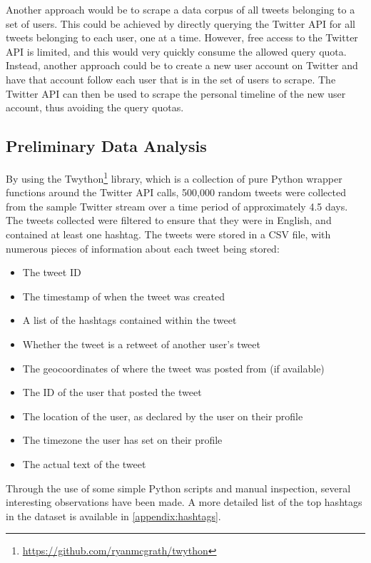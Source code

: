 \documentclass[12pt,a4paper]{article}
\begin{document}
Another approach would be to scrape a data corpus of all tweets belonging to a set of users. This could be achieved by directly querying the Twitter API for all tweets belonging to each user, one at a time. However, free access to the Twitter API is limited, and this would very quickly consume the allowed query quota. Instead, another approach could be to create a new user account on Twitter and have that account follow each user that is in the set of users to scrape. The Twitter API can then be used to scrape the personal timeline of the new user account, thus avoiding the query quotas.

\subsection{Preliminary Data Analysis}
By using the Twython\footnote{\url{https://github.com/ryanmcgrath/twython}} library, which is a collection of pure Python wrapper functions around the Twitter API calls, 500,000 random tweets were collected from the sample Twitter stream over a time period of approximately 4.5 days. The tweets collected were filtered to ensure that they were in English, and contained at least one hashtag. The tweets were stored in a CSV file, with numerous pieces of information about each tweet being stored:
\begin{itemize}
    \item The tweet ID
    \item The timestamp of when the tweet was created
    \item A list of the hashtags contained within the tweet
    \item Whether the tweet is a retweet of another user's tweet
    \item The geocoordinates of where the tweet was posted from (if available)
    \item The ID of the user that posted the tweet
    \item The location of the user, as declared by the user on their profile
    \item The timezone the user has set on their profile
    \item The actual text of the tweet
\end{itemize}

Through the use of some simple Python scripts and manual inspection, several interesting observations have been made. A more detailed list of the top hashtags in the dataset is available in \autoref{appendix:hashtags}.
\end{document}
